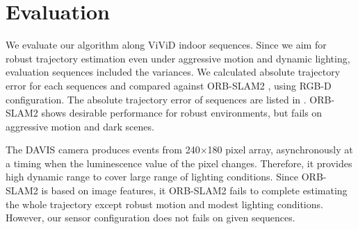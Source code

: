 \section{Evaluation}
\label{sec:result}

\begin{table}[b]
	\centering
	\caption{Absolute Trajectory Error for ViViD sequences}
	\label{tab:errmat}
\end{table}

We evaluate our algorithm along ViViD indoor sequences. Since we aim for robust trajectory
estimation even under aggressive motion and dynamic lighting, evaluation sequences included
the variances. We calculated absolute trajectory error for each sequences and compared against
ORB-SLAM2 \cite{mur2017orb}, using RGB-D configuration. 
The absolute trajectory error of sequences are listed in . ORB-SLAM2 shows
desirable performance for robust environments, but fails on aggressive motion and dark scenes.

The DAVIS camera produces events from 240$\times$180 pixel array, asynchronously at a
timing when the luminescence value of the pixel changes. Therefore, it provides high dynamic
range to cover large range of lighting conditions. Since ORB-SLAM2 is based on image features,
it ORB-SLAM2 fails to complete estimating the whole trajectory except robust motion and modest
lighting conditions. However, our sensor configuration does not fails on given sequences.

